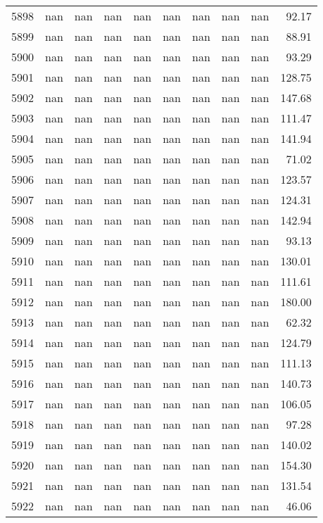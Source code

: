 \begin{tabular}{lrrrrrrrrr}
5898 & nan & nan & nan & nan & nan & nan & nan & nan & 92.17 \\
5899 & nan & nan & nan & nan & nan & nan & nan & nan & 88.91 \\
5900 & nan & nan & nan & nan & nan & nan & nan & nan & 93.29 \\
5901 & nan & nan & nan & nan & nan & nan & nan & nan & 128.75 \\
5902 & nan & nan & nan & nan & nan & nan & nan & nan & 147.68 \\
5903 & nan & nan & nan & nan & nan & nan & nan & nan & 111.47 \\
5904 & nan & nan & nan & nan & nan & nan & nan & nan & 141.94 \\
5905 & nan & nan & nan & nan & nan & nan & nan & nan & 71.02 \\
5906 & nan & nan & nan & nan & nan & nan & nan & nan & 123.57 \\
5907 & nan & nan & nan & nan & nan & nan & nan & nan & 124.31 \\
5908 & nan & nan & nan & nan & nan & nan & nan & nan & 142.94 \\
5909 & nan & nan & nan & nan & nan & nan & nan & nan & 93.13 \\
5910 & nan & nan & nan & nan & nan & nan & nan & nan & 130.01 \\
5911 & nan & nan & nan & nan & nan & nan & nan & nan & 111.61 \\
5912 & nan & nan & nan & nan & nan & nan & nan & nan & 180.00 \\
5913 & nan & nan & nan & nan & nan & nan & nan & nan & 62.32 \\
5914 & nan & nan & nan & nan & nan & nan & nan & nan & 124.79 \\
5915 & nan & nan & nan & nan & nan & nan & nan & nan & 111.13 \\
5916 & nan & nan & nan & nan & nan & nan & nan & nan & 140.73 \\
5917 & nan & nan & nan & nan & nan & nan & nan & nan & 106.05 \\
5918 & nan & nan & nan & nan & nan & nan & nan & nan & 97.28 \\
5919 & nan & nan & nan & nan & nan & nan & nan & nan & 140.02 \\
5920 & nan & nan & nan & nan & nan & nan & nan & nan & 154.30 \\
5921 & nan & nan & nan & nan & nan & nan & nan & nan & 131.54 \\
5922 & nan & nan & nan & nan & nan & nan & nan & nan & 46.06 \\

\end{tabular}
